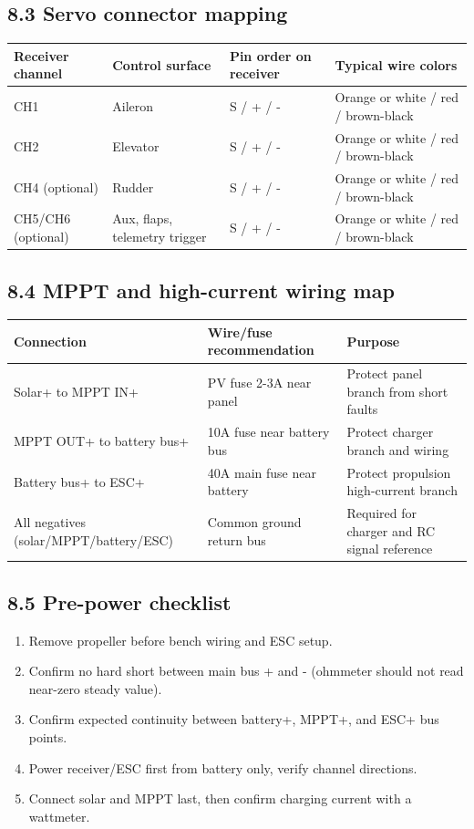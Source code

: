 \documentclass[11pt]{article}
\begin{document}
\subsection*{8.3 Servo connector mapping}
{\small
\begin{longtable}{>{\raggedright\arraybackslash}p{2.4cm} >{\raggedright\arraybackslash}p{2.6cm} >{\raggedright\arraybackslash}p{3.8cm} >{\raggedright\arraybackslash}p{3.8cm}}
\toprule
Receiver channel & Control surface & Pin order on receiver & Typical wire colors \\
\midrule
\endhead
CH1 & Aileron & S / + / - & Orange or white / red / brown-black \\
CH2 & Elevator & S / + / - & Orange or white / red / brown-black \\
CH4 (optional) & Rudder & S / + / - & Orange or white / red / brown-black \\
CH5/CH6 (optional) & Aux, flaps, telemetry trigger & S / + / - & Orange or white / red / brown-black \\
\bottomrule
\end{longtable}
}

\subsection*{8.4 MPPT and high-current wiring map}
{\small
\begin{longtable}{>{\raggedright\arraybackslash}p{3.8cm} >{\raggedright\arraybackslash}p{3.2cm} >{\raggedright\arraybackslash}p{4.0cm}}
\toprule
Connection & Wire/fuse recommendation & Purpose \\
\midrule
\endhead
Solar+ to MPPT IN+ & PV fuse 2-3A near panel & Protect panel branch from short faults \\
MPPT OUT+ to battery bus+ & 10A fuse near battery bus & Protect charger branch and wiring \\
Battery bus+ to ESC+ & 40A main fuse near battery & Protect propulsion high-current branch \\
All negatives (solar/MPPT/battery/ESC) & Common ground return bus & Required for charger and RC signal reference \\
\bottomrule
\end{longtable}
}

\subsection*{8.5 Pre-power checklist}
\begin{enumerate}
  \item Remove propeller before bench wiring and ESC setup.
  \item Confirm no hard short between main bus + and - (ohmmeter should not read near-zero steady value).
  \item Confirm expected continuity between battery+, MPPT+, and ESC+ bus points.
  \item Power receiver/ESC first from battery only, verify channel directions.
  \item Connect solar and MPPT last, then confirm charging current with a wattmeter.
\end{enumerate}
\end{document}

